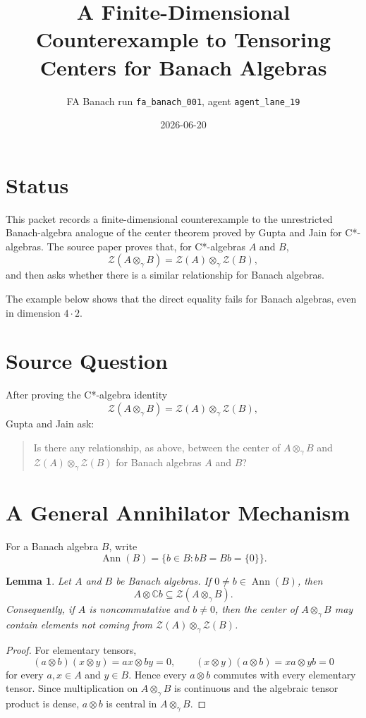 \documentclass[11pt]{article}
\title{A Finite-Dimensional Counterexample to Tensoring Centers for Banach Algebras}
\author{FA Banach run \texttt{fa\_banach\_001}, agent \texttt{agent\_lane\_19}}
\date{2026-06-20}
\newtheorem{lemma}{Lemma}
\newcommand{\C}{\mathbb C}
\newcommand{\Z}{\mathcal Z}
\newcommand{\otg}{\otimes_\gamma}
\newcommand{\Ann}{\operatorname{Ann}}
\begin{document}
\maketitle

\section*{Status}

This packet records a finite-dimensional counterexample to the unrestricted
Banach-algebra analogue of the center theorem proved by Gupta and Jain for
C*-algebras. The source paper proves that, for C*-algebras \(A\) and \(B\),
\[
  \Z(A\otg B)=\Z(A)\otg \Z(B),
\]
and then asks whether there is a similar relationship for Banach algebras.

The example below shows that the direct equality fails for Banach algebras, even
in dimension \(4\cdot 2\).

\section*{Source Question}

After proving the C*-algebra identity
\[
  \Z(A\otg B)=\Z(A)\otg\Z(B),
\]
Gupta and Jain ask:
\begin{quote}
Is there any relationship, as above, between the center of \(A\otg B\) and
\(\Z(A)\otg\Z(B)\) for Banach algebras \(A\) and \(B\)?
\end{quote}

\section*{A General Annihilator Mechanism}

For a Banach algebra \(B\), write
\[
  \Ann(B)=\{b\in B: bB=Bb=\{0\}\}.
\]

\begin{lemma}
Let \(A\) and \(B\) be Banach algebras. If \(0\neq b\in\Ann(B)\), then
\[
  A\otimes \C b \subseteq \Z(A\otg B).
\]
Consequently, if \(A\) is noncommutative and \(b\neq0\), then the center of
\(A\otg B\) may contain elements not coming from \(\Z(A)\otg\Z(B)\).
\end{lemma}

\begin{proof}
For elementary tensors,
\[
  (a\otimes b)(x\otimes y)=ax\otimes by=0,\qquad
  (x\otimes y)(a\otimes b)=xa\otimes yb=0
\]
for every \(a,x\in A\) and \(y\in B\). Hence every \(a\otimes b\) commutes with
every elementary tensor. Since multiplication on \(A\otg B\) is continuous and
the algebraic tensor product is dense, \(a\otimes b\) is central in
\(A\otg B\).
\end{proof}
\end{document}
